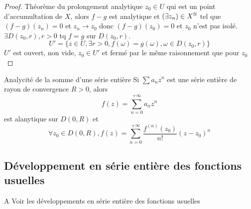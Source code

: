 \documentclass[]{report}
\begin{document}
\begin{proof}{Théorème du prolongement analytique}{}
    $z_0\in U$ qui est un point d'accumultation de $X$, alors $f-g$ est analytique et $(\exists z_n)\in X^{\mathbb{N}}$ tel que $(f-g)(z_n)=0$ et $z_n \to z_0$ donc $(f-g)(z_0)=0$ et $z_0$ n'est pas isolé.\\
    $\exists D(z_0,r),r>0$ tq $f=g$ sur $D(z_0,r)$.
    \[U'=\{z\in U,\exists r>0,f(\omega)=g(\omega),\omega\in D(z_0,r)\}\]
    $U'$ est ouvert, non vide, $z_0\in U'$ et fermé par le même raisonnement que pour $z_0$
\end{proof}

\begin{tm}{Analycité de la somme d'une série entière}{}
    Si $\sum a_n z^n$ est une série entière de rayon de convergence $R>0$, alors
    \[f(z)=\sum_{n=0}^{+\infty} a_n z^n\]
    est alanytique sur $D(0,R)$ et
    \[\forall z_0\in D(0,R),f(z)=\sum_{n=0}^{+\infty} \frac{f^{(n)}(z_0)}{n!}(z-z_0)^n\]
\end{tm}

\subsection{Développement en série entière des fonctions usuelles}

A Voir les développements en série entière des fonctions usuelles
\end{document}
